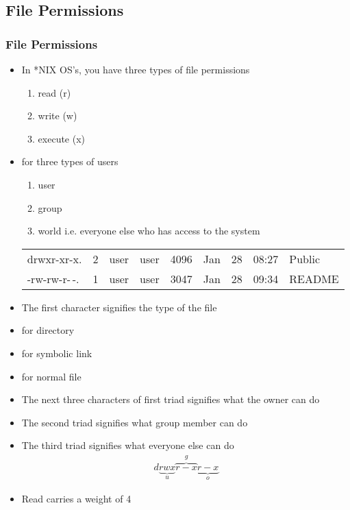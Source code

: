 \documentclass[10pt,t]{beamer}
\begin{document}
\subsection{File Permissions}
\begin{frame}
  \frametitle{File Permissions}
  \begin{itemize}
    \item In *NIX OS's, you have three types of file permissions
    \begin{enumerate}
        \item read (r)
        \item write (w)
        \item execute (x)
    \end{enumerate}
    \item for three types of users
    \begin{enumerate}
        \item user
        \item group
        \item world i.e. everyone else who has access to the system
    \end{enumerate}
    \begin{exampleblock}{}
      \begin{tabular}{lllllllll}
        drwxr-xr-x. & 2 & user & user & 4096 & Jan & 28 & 08:27 & Public\\
        -rw-rw-r-\,-. & 1 & user & user & 3047 & Jan & 28 & 09:34 & README\\
      \end{tabular}
    \end{exampleblock}
    \item The first character signifies the type of the file
    \item[]  for directory
    \item[]  for symbolic link
    \item[] \Verblubrown{-} for normal file
    \item The next three characters of first triad signifies what the owner can do
    \item The second triad signifies what group member can do
    \item The third triad signifies what everyone else can do
      \begin{gather*}
        d\underbrace{rwx}_{u}\overbrace{r-x}^g\underbrace{r-x}_o
      \end{gather*}
    \item Read carries a weight of 4

\end{itemize}
\end{frame}
\end{document}

